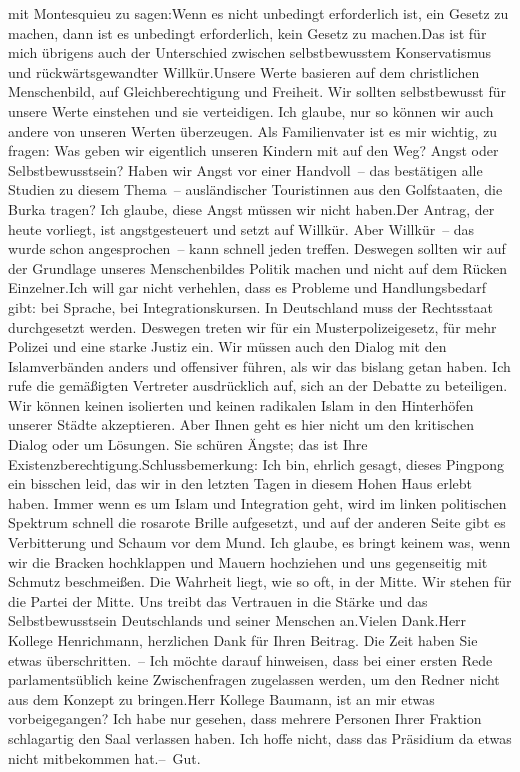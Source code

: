 \documentclass{article}
\begin{document}
mit Montesquieu zu sagen:Wenn es nicht unbedingt erforderlich ist, ein Gesetz zu machen, dann ist es unbedingt erforderlich, kein Gesetz zu machen.Das ist für mich übrigens auch der Unterschied zwischen selbstbewusstem Konservatismus und rückwärtsgewandter Willkür.Unsere Werte basieren auf dem christlichen Menschenbild, auf Gleichberechtigung und Freiheit. Wir sollten selbstbewusst für unsere Werte einstehen und sie verteidigen. Ich glaube, nur so können wir auch andere von unseren Werten überzeugen. Als Familienvater ist es mir wichtig, zu fragen: Was geben wir eigentlich unseren Kindern mit auf den Weg? Angst oder Selbstbewusstsein? Haben wir Angst vor einer Handvoll – das bestätigen alle Studien zu diesem Thema – ausländischer Touristinnen aus den Golfstaaten, die Burka tragen? Ich glaube, diese Angst müssen wir nicht haben.Der Antrag, der heute vorliegt, ist angstgesteuert und setzt auf Willkür. Aber Willkür – das wurde schon angesprochen – kann schnell jeden treffen. Deswegen sollten wir auf der Grundlage unseres Menschenbildes Politik machen und nicht auf dem Rücken Einzelner.Ich will gar nicht verhehlen, dass es Probleme und Handlungsbedarf gibt: bei Sprache, bei Integrationskursen. In Deutschland muss der Rechtsstaat durchgesetzt werden. Deswegen treten wir für ein Musterpolizeigesetz, für mehr Polizei und eine starke Justiz ein. Wir müssen auch den Dialog mit den Islamverbänden anders und offensiver führen, als wir das bislang getan haben. Ich rufe die gemäßigten Vertreter ausdrücklich auf, sich an der Debatte zu beteiligen. Wir können keinen isolierten und keinen radikalen Islam in den Hinterhöfen unserer Städte akzeptieren. Aber Ihnen geht es hier nicht um den kritischen Dialog oder um Lösungen. Sie schüren Ängste; das ist Ihre Existenzberechtigung.Schlussbemerkung: Ich bin, ehrlich gesagt, dieses Pingpong ein bisschen leid, das wir in den letzten Tagen in diesem Hohen Haus erlebt haben. Immer wenn es um Islam und Integration geht, wird im linken politischen Spektrum schnell die rosarote Brille aufgesetzt, und auf der anderen Seite gibt es Verbitterung und Schaum vor dem Mund. Ich glaube, es bringt keinem was, wenn wir die Bracken hochklappen und Mauern hochziehen und uns gegenseitig mit Schmutz beschmeißen. Die Wahrheit liegt, wie so oft, in der Mitte. Wir stehen für die Partei der Mitte. Uns treibt das Vertrauen in die Stärke und das Selbstbewusstsein Deutschlands und seiner Menschen an.Vielen Dank.Herr Kollege Henrichmann, herzlichen Dank für Ihren Beitrag. Die Zeit haben Sie etwas überschritten. – Ich möchte darauf hinweisen, dass bei einer ersten Rede parlamentsüblich keine Zwischenfragen zugelassen werden, um den Redner nicht aus dem Konzept zu bringen.Herr Kollege Baumann, ist an mir etwas vorbeigegangen? Ich habe nur gesehen, dass mehrere Personen Ihrer Fraktion schlagartig den Saal verlassen haben. Ich hoffe nicht, dass das Präsidium da etwas nicht mitbekommen hat.– Gut.
\end{document}
